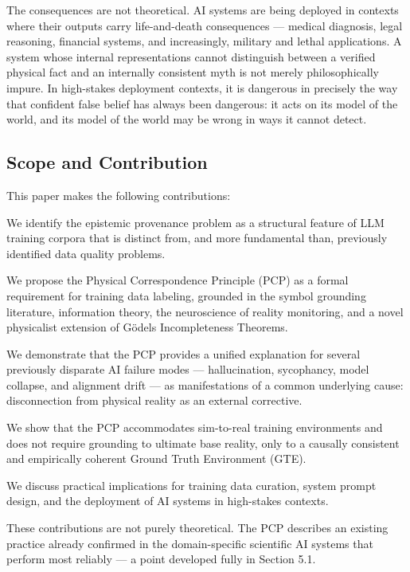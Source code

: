 \documentclass[12pt]{article}
\begin{document}
The consequences are not theoretical. AI systems are being deployed in
contexts where their outputs carry life-and-death consequences ---
medical diagnosis, legal reasoning, financial systems, and increasingly,
military and lethal applications. A system whose internal
representations cannot distinguish between a verified physical fact and
an internally consistent myth is not merely philosophically impure. In
high-stakes deployment contexts, it is dangerous in precisely the way
that confident false belief has always been dangerous: it acts on its
model of the world, and its model of the world may be wrong in ways it
cannot detect.

\subsection{Scope and Contribution}\label{scope-and-contribution}

This paper makes the following contributions:

We identify the epistemic provenance problem as a structural feature of
LLM training corpora that is distinct from, and more fundamental than,
previously identified data quality problems.

We propose the Physical Correspondence Principle (PCP) as a formal
requirement for training data labeling, grounded in the symbol grounding
literature, information theory, the neuroscience of reality monitoring,
and a novel physicalist extension of Gödel\textquotesingle s
Incompleteness Theorems.

We demonstrate that the PCP provides a unified explanation for several
previously disparate AI failure modes --- hallucination, sycophancy,
model collapse, and alignment drift --- as manifestations of a common
underlying cause: disconnection from physical reality as an external
corrective.

We show that the PCP accommodates sim-to-real training environments and
does not require grounding to ultimate base reality, only to a causally
consistent and empirically coherent Ground Truth Environment (GTE).

We discuss practical implications for training data curation, system
prompt design, and the deployment of AI systems in high-stakes contexts.

These contributions are not purely theoretical. The PCP describes an
existing practice already confirmed in the domain-specific scientific AI
systems that perform most reliably --- a point developed fully in
Section 5.1.
\end{document}
